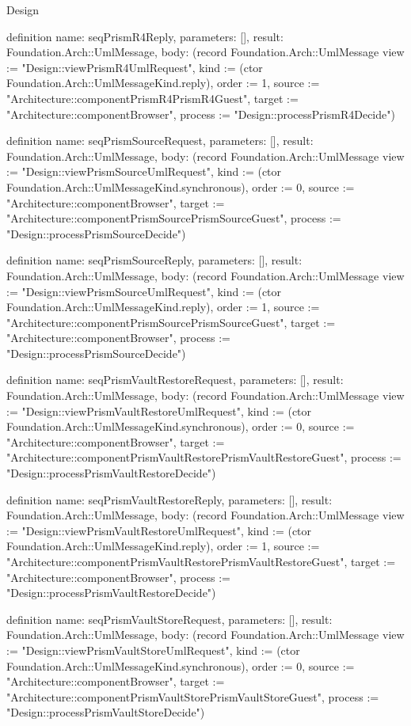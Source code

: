 \begin{lexlean}{Design}
\begin{semanticmodule}
definition{
  name: seqPrismR4Reply,
  parameters: [],
  result: Foundation.Arch::UmlMessage,
  body: (record Foundation.Arch::UmlMessage {view := "Design::viewPrismR4UmlRequest", kind := (ctor Foundation.Arch::UmlMessageKind.reply), order := 1, source := "Architecture::componentPrismR4PrismR4Guest", target := "Architecture::componentBrowser", process := "Design::processPrismR4Decide"})
}

definition{
  name: seqPrismSourceRequest,
  parameters: [],
  result: Foundation.Arch::UmlMessage,
  body: (record Foundation.Arch::UmlMessage {view := "Design::viewPrismSourceUmlRequest", kind := (ctor Foundation.Arch::UmlMessageKind.synchronous), order := 0, source := "Architecture::componentBrowser", target := "Architecture::componentPrismSourcePrismSourceGuest", process := "Design::processPrismSourceDecide"})
}

definition{
  name: seqPrismSourceReply,
  parameters: [],
  result: Foundation.Arch::UmlMessage,
  body: (record Foundation.Arch::UmlMessage {view := "Design::viewPrismSourceUmlRequest", kind := (ctor Foundation.Arch::UmlMessageKind.reply), order := 1, source := "Architecture::componentPrismSourcePrismSourceGuest", target := "Architecture::componentBrowser", process := "Design::processPrismSourceDecide"})
}

definition{
  name: seqPrismVaultRestoreRequest,
  parameters: [],
  result: Foundation.Arch::UmlMessage,
  body: (record Foundation.Arch::UmlMessage {view := "Design::viewPrismVaultRestoreUmlRequest", kind := (ctor Foundation.Arch::UmlMessageKind.synchronous), order := 0, source := "Architecture::componentBrowser", target := "Architecture::componentPrismVaultRestorePrismVaultRestoreGuest", process := "Design::processPrismVaultRestoreDecide"})
}

definition{
  name: seqPrismVaultRestoreReply,
  parameters: [],
  result: Foundation.Arch::UmlMessage,
  body: (record Foundation.Arch::UmlMessage {view := "Design::viewPrismVaultRestoreUmlRequest", kind := (ctor Foundation.Arch::UmlMessageKind.reply), order := 1, source := "Architecture::componentPrismVaultRestorePrismVaultRestoreGuest", target := "Architecture::componentBrowser", process := "Design::processPrismVaultRestoreDecide"})
}

definition{
  name: seqPrismVaultStoreRequest,
  parameters: [],
  result: Foundation.Arch::UmlMessage,
  body: (record Foundation.Arch::UmlMessage {view := "Design::viewPrismVaultStoreUmlRequest", kind := (ctor Foundation.Arch::UmlMessageKind.synchronous), order := 0, source := "Architecture::componentBrowser", target := "Architecture::componentPrismVaultStorePrismVaultStoreGuest", process := "Design::processPrismVaultStoreDecide"})
}


\end{semanticmodule}
\end{lexlean}
